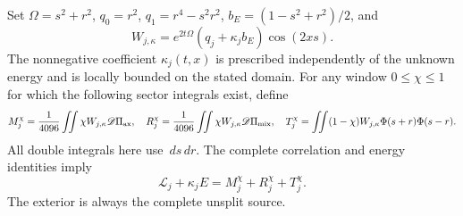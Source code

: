 \documentclass[11pt]{article}
\numberwithin{equation}{section}
\theoremstyle{definition}
\theoremstyle{remark}
\newcommand{\dd}{\,d}
\newcommand{\Lag}{\mathcal L}
\begin{document}
Set $\Omega=s^2+r^2$, $q_0=r^2$, $q_1=r^4-s^2r^2$,
$b_E=(1-s^2+r^2)/2$, and
\[
 W_{j,\kappa}=e^{2t\Omega}(q_j+\kappa_jb_E)\cos(2xs).
\]
The nonnegative coefficient $\kappa_j(t,x)$ is prescribed independently
of the unknown energy and is locally bounded on the stated domain.
For any window $0\le\chi\le1$ for which the following sector integrals
exist, define
\[
 M_j^\chi=\frac1{4096}\iint\chi W_{j,\kappa}\mathscr D\Pi_{\rm ax},
 \quad R_j^\chi=\frac1{4096}\iint\chi W_{j,\kappa}\mathscr D\Pi_{\rm mix},
 \quad T_j^\chi=\iint(1-\chi)W_{j,\kappa}\Phi(s+r)\Phi(s-r).
\]
All double integrals here use $\dd s\dd r$. The complete correlation
and energy identities imply
\begin{equation}
 \Lag_j+\kappa_jE=M_j^\chi+R_j^\chi+T_j^\chi.
 \label{upd:localized-budget}
\end{equation}
The exterior is always the complete unsplit source.
\end{document}
